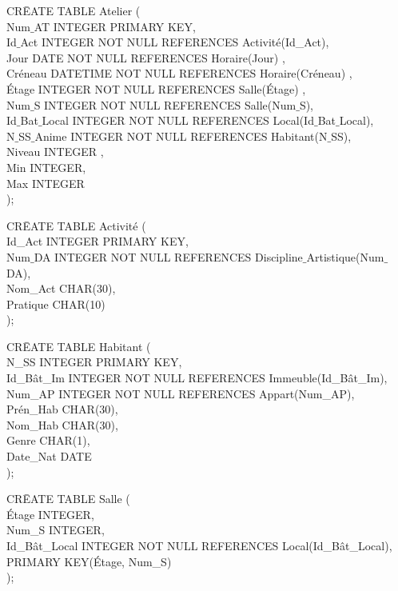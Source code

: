 \documentclass[a4paper,10.5pt]{report}
\begin{document}
		\begin{tabbing}
			CR\=EATE TABLE Atelier (\\
			\> Num$\_$AT INTEGER PRIMARY KEY,\\
			\> Id$\_$Act INTEGER NOT NULL REFERENCES Activité(Id\_Act),\\
			\> Jour DATE NOT NULL REFERENCES Horaire(Jour) ,\\
			\> Créneau DATETIME NOT NULL REFERENCES Horaire(Créneau) ,\\
			\> Étage INTEGER NOT NULL REFERENCES Salle(Étage) ,\\
			\> Num$\_$S INTEGER NOT NULL REFERENCES Salle(Num$\_$S),\\
			\> Id$\_$Bat$\_$Local INTEGER NOT NULL REFERENCES Local(Id$\_$Bat$\_$Local),\\
			\> N$\_$SS$\_$Anime  INTEGER NOT NULL REFERENCES Habitant(N$\_$SS),\\
			\> Niveau INTEGER ,\\
			\> Min INTEGER,\\
			\> Max INTEGER\\);
		\end{tabbing}

		\begin{tabbing}
			CR\=EATE TABLE Activité (\\
			\> Id\_Act INTEGER PRIMARY KEY,\\
			\> Num$\_$DA INTEGER NOT NULL REFERENCES Discipline$\_$Artistique(Num$\_$DA),\\
			\> Nom\_Act CHAR(30),\\
			\> Pratique CHAR(10)\\);
		\end{tabbing}

		\begin{tabbing}
			CR\=EATE TABLE Habitant (\\
			\> N\_SS INTEGER PRIMARY KEY,\\
			\> Id\_Bât\_Im INTEGER NOT NULL REFERENCES Immeuble(Id\_Bât\_Im),\\
			\> Num\_AP INTEGER NOT NULL REFERENCES Appart(Num\_AP),\\
			\> Prén\_Hab CHAR(30),\\
			\> Nom\_Hab CHAR(30),\\
			\> Genre CHAR(1),\\
			\> Date\_Nat DATE\\);
		\end{tabbing}

		\begin{tabbing}
			CR\=EATE TABLE Salle (\\
			\> Étage INTEGER,\\
			\> Num\_S INTEGER,\\
			\> Id\_Bât\_Local INTEGER NOT NULL REFERENCES Local(Id\_Bât\_Local),\\
			\> PRIMARY KEY(Étage, Num\_S)\\);
		\end{tabbing}
\end{document}

